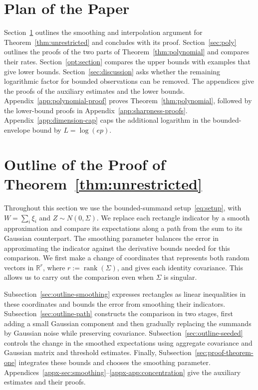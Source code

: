 \documentclass[11pt,letterpaper]{article}
\newenvironment{recovered}{}{}
\theoremstyle{remark}
\newcommand{\R}{\mathbb R}
\begin{document}
\section*{Plan of the Paper}
Section~\ref{sec:smoothing} outlines the smoothing and interpolation
argument for Theorem~\ref{thm:unrestricted} and concludes with its proof.
{Section~\ref{sec:poly} outlines the proofs of the two
parts of Theorem~\ref{thm:polynomial} and compares their rates.}
Section~\ref{opt:section} compares the upper bounds with examples that
give lower bounds. Section~\ref{sec:discussion} asks whether the remaining
logarithmic factor for bounded observations can be removed. The appendices
give the proofs of the auxiliary estimates and the lower bounds.
{Appendix~\ref{app:polynomial-proof} proves
Theorem~\ref{thm:polynomial}, followed by the lower-bound proofs in
Appendix~\ref{app:sharpness-proofs}.}
Appendix~\ref{app:dimension-cap} caps the additional logarithm in the
bounded-envelope bound by \(L=\log(ep)\).

\section{Outline of the Proof of Theorem~\ref*{thm:unrestricted}}\label{sec:smoothing}
Throughout this section we use the bounded-summand setup~\eqref{eq:setup},
with \(W=\sum_i\xi_i\) and \(Z\sim N(0,\Sigma)\).
We replace each rectangle indicator by a smooth approximation and compare
its expectations along a path from the sum to its Gaussian counterpart.
The smoothing parameter balances the error in approximating the indicator
against the derivative bounds needed for this comparison.
We first make a change of coordinates that represents both random vectors
in \(\R^r\), where \(r:=\operatorname{rank}(\Sigma)\), and gives each
identity covariance. This allows us to carry out the comparison even
when \(\Sigma\) is singular.

\begin{recovered}
Subsection~\ref{sec:outline-smoothing} expresses rectangles as linear
inequalities in these coordinates and bounds the error from smoothing
their indicators. Subsection~\ref{sec:outline-path} constructs the
comparison in two stages, first adding a small Gaussian component and
then gradually replacing the summands by Gaussian noise while preserving
covariance. Subsection~\ref{sec:outline-seeded} controls the change in
the smoothed expectations using aggregate covariance and Gaussian matrix
and threshold estimates. Finally, Subsection~\ref{sec:proof-theorem-one}
integrates these bounds and chooses the smoothing parameter.
Appendices~\ref{appx-sec:smoothing}--\ref{appx-app:concentration}
give the auxiliary estimates and their proofs.
\end{recovered}
\end{document}
